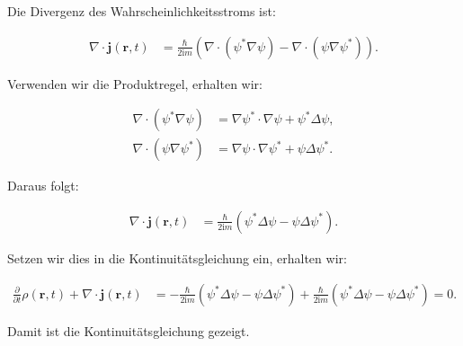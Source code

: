 Die Divergenz des Wahrscheinlichkeitsstroms ist:

\begin{align*}
\nabla \cdot \mathbf{j}(\mathbf{r}, t) &= \frac{\hbar}{2 \mathrm{i} m} \left( \nabla \cdot (\psi^* \nabla \psi) - \nabla \cdot (\psi \nabla \psi^*) \right).
\end{align*}

Verwenden wir die Produktregel, erhalten wir:

\begin{align*}
\nabla \cdot (\psi^* \nabla \psi) &= \nabla \psi^* \cdot \nabla \psi + \psi^* \Delta \psi, \\
\nabla \cdot (\psi \nabla \psi^*) &= \nabla \psi \cdot \nabla \psi^* + \psi \Delta \psi^*.
\end{align*}

Daraus folgt:

\begin{align*}
\nabla \cdot \mathbf{j}(\mathbf{r}, t) &= \frac{\hbar}{2 \mathrm{i} m} \left( \psi^* \Delta \psi - \psi \Delta \psi^* \right).
\end{align*}

Setzen wir dies in die Kontinuitätsgleichung ein, erhalten wir:

\begin{align*}
\frac{\partial}{\partial t} \rho(\mathbf{r}, t) + \nabla \cdot \mathbf{j}(\mathbf{r}, t) &= -\frac{\hbar}{2 \mathrm{i} m} \left( \psi^* \Delta \psi - \psi \Delta \psi^* \right) + \frac{\hbar}{2 \mathrm{i} m} \left( \psi^* \Delta \psi - \psi \Delta \psi^* \right) = 0.
\end{align*}

Damit ist die Kontinuitätsgleichung gezeigt.

